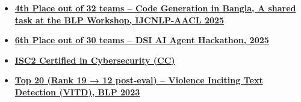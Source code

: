 
\vspace{0.3em}

\begin{extraCurriculars}
	\extraCurricular
        {
        \begin{itemize}
            \vspace{-1em}

            \item \textbf {\href{https://noshinulfat.github.io/blp25_code_generation_task/#/home:~:text=AdversaryAI,0.850}{4th Place out of 32 teams – Code Generation in Bangla, A shared task at the BLP Workshop, IJCNLP-AACL 2025}} 
            \vspace{0.3em}    
            
            \item \textbf {\href{https://github.com/riyadomf/knowledgeRelay/blob/main/AI\%20Agent\%20Hackathon\%20Leaderboard\%20Report.pdf}{6th Place out of 30 teams – DSI AI Agent Hackathon, 2025}} 
            \vspace{0.3em}          
            
            \item \textbf{\href{https://www.credly.com/badges/080d28bf-8f3e-4124-aaa5-ed49855f3f85/public_url}{ISC2 Certified in Cybersecurity (CC)}} 
            \vspace{0.3em}
            
            \item \textbf{\href{https://github.com/blp-workshop/blp_task1}{Top 20 (Rank 19 → 12 post-eval) – Violence Inciting Text Detection (VITD), BLP 2023}} 

                        \vspace{-0.5em}
        \end{itemize}
        }
\end{extraCurriculars}